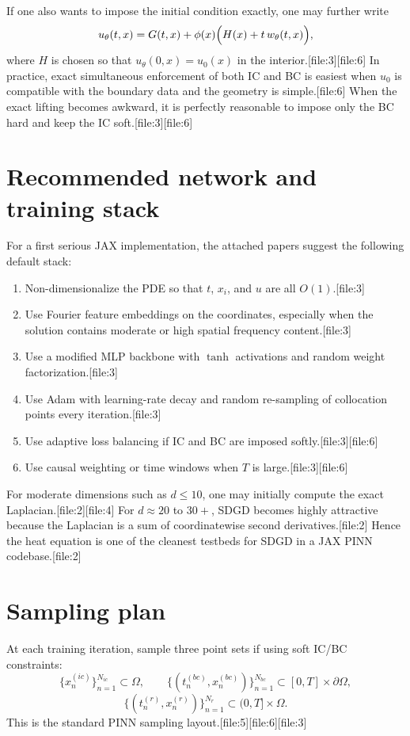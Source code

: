 \documentclass[11pt]{report}
\begin{document}
If one also wants to impose the initial condition exactly, one may further write
\[
u_\theta(t,x)=G(t,x)+\phi(x)\Bigl(H(x)+t\,w_\theta(t,x)\Bigr),
\]
where \(H\) is chosen so that \(u_\theta(0,x)=u_0(x)\) in the interior.[file:3][file:6]  
In practice, exact simultaneous enforcement of both IC and BC is easiest when \(u_0\) is compatible with the boundary data and the geometry is simple.[file:6]  
When the exact lifting becomes awkward, it is perfectly reasonable to impose only the BC hard and keep the IC soft.[file:3][file:6]

\section{Recommended network and training stack}

For a first serious JAX implementation, the attached papers suggest the following default stack:
\begin{enumerate}[label=\arabic*.]
\item Non-dimensionalize the PDE so that \(t\), \(x_i\), and \(u\) are all \(O(1)\).[file:3]
\item Use Fourier feature embeddings on the coordinates, especially when the solution contains moderate or high spatial frequency content.[file:3]
\item Use a modified MLP backbone with \(\tanh\) activations and random weight factorization.[file:3]
\item Use Adam with learning-rate decay and random re-sampling of collocation points every iteration.[file:3]
\item Use adaptive loss balancing if IC and BC are imposed softly.[file:3][file:6]
\item Use causal weighting or time windows when \(T\) is large.[file:3][file:6]
\end{enumerate}

For moderate dimensions such as \(d\le 10\), one may initially compute the exact Laplacian.[file:2][file:4]  
For \(d\approx 20\) to \(30+\), SDGD becomes highly attractive because the Laplacian is a sum of coordinatewise second derivatives.[file:2]  
Hence the heat equation is one of the cleanest testbeds for SDGD in a JAX PINN codebase.[file:2]

\section{Sampling plan}

At each training iteration, sample three point sets if using soft IC/BC constraints:
\[
\{x_n^{(ic)}\}_{n=1}^{N_{ic}} \subset \Omega,
\qquad
\{(t_n^{(bc)},x_n^{(bc)})\}_{n=1}^{N_{bc}} \subset [0,T]\times \partial\Omega,
\]
\[
\{(t_n^{(r)},x_n^{(r)})\}_{n=1}^{N_r} \subset (0,T]\times \Omega.
\]
This is the standard PINN sampling layout.[file:5][file:6][file:3]
\end{document}
